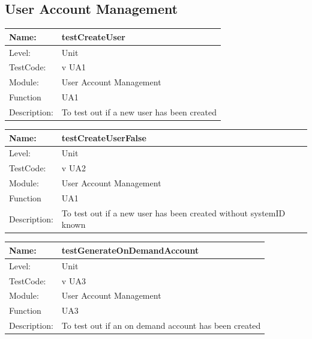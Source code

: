 \documentclass[12pt]{article}
\begin{document}
\subsection{User Account Management}
\begin{center}
\begin{tabular}{|l|p{12cm}|}
\hline

 Name: & testCreateUser \\
\hline
Level: & Unit \\
\hline
TestCode: & v UA1 \\
\hline
Module:& User Account Management\\
\hline
Function & UA1 \\
\hline
Description: & To test out if a new user has been created \\
\hline

\end{tabular}
\end{center}


\begin{center}
\begin{tabular}{|l|p{12cm}|}
\hline

 Name: & testCreateUserFalse \\
\hline
Level: & Unit \\
\hline
TestCode: & v UA2 \\
\hline
Module:& User Account Management\\
\hline
Function & UA1 \\
\hline
Description: & To test out if a new user has been created without systemID known\\
\hline

\end{tabular}
\end{center}

\begin{center}
\begin{tabular}{|l|p{12cm}|}
\hline

 Name: & testGenerateOnDemandAccount \\
\hline
Level: & Unit \\
\hline
TestCode: & v UA3 \\
\hline
Module:& User Account Management\\
\hline
Function & UA3 \\
\hline
Description: & To test out if an on demand account has been created \\
\hline

\end{tabular}
\end{center}
\end{document}
